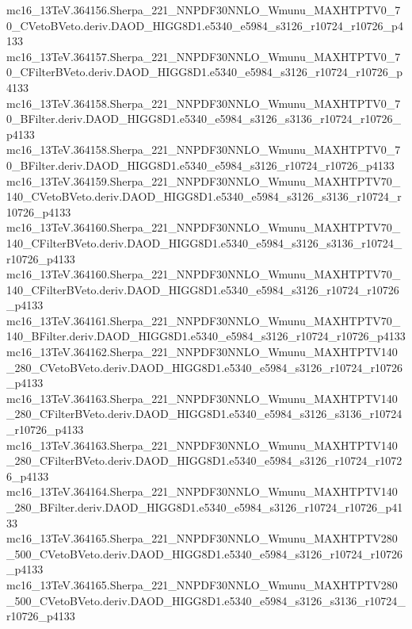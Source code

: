 \begin{scriptsize}
mc16\_13TeV.364156.Sherpa\_221\_NNPDF30NNLO\_Wmunu\_MAXHTPTV0\_70\_CVetoBVeto.deriv.DAOD\_HIGG8D1.e5340\_e5984\_s3126\_r10724\_r10726\_p4133 \\
mc16\_13TeV.364157.Sherpa\_221\_NNPDF30NNLO\_Wmunu\_MAXHTPTV0\_70\_CFilterBVeto.deriv.DAOD\_HIGG8D1.e5340\_e5984\_s3126\_r10724\_r10726\_p4133 \\
mc16\_13TeV.364158.Sherpa\_221\_NNPDF30NNLO\_Wmunu\_MAXHTPTV0\_70\_BFilter.deriv.DAOD\_HIGG8D1.e5340\_e5984\_s3126\_s3136\_r10724\_r10726\_p4133 \\
mc16\_13TeV.364158.Sherpa\_221\_NNPDF30NNLO\_Wmunu\_MAXHTPTV0\_70\_BFilter.deriv.DAOD\_HIGG8D1.e5340\_e5984\_s3126\_r10724\_r10726\_p4133 \\
mc16\_13TeV.364159.Sherpa\_221\_NNPDF30NNLO\_Wmunu\_MAXHTPTV70\_140\_CVetoBVeto.deriv.DAOD\_HIGG8D1.e5340\_e5984\_s3126\_s3136\_r10724\_r10726\_p4133 \\
mc16\_13TeV.364160.Sherpa\_221\_NNPDF30NNLO\_Wmunu\_MAXHTPTV70\_140\_CFilterBVeto.deriv.DAOD\_HIGG8D1.e5340\_e5984\_s3126\_s3136\_r10724\_r10726\_p4133 \\
mc16\_13TeV.364160.Sherpa\_221\_NNPDF30NNLO\_Wmunu\_MAXHTPTV70\_140\_CFilterBVeto.deriv.DAOD\_HIGG8D1.e5340\_e5984\_s3126\_r10724\_r10726\_p4133 \\
mc16\_13TeV.364161.Sherpa\_221\_NNPDF30NNLO\_Wmunu\_MAXHTPTV70\_140\_BFilter.deriv.DAOD\_HIGG8D1.e5340\_e5984\_s3126\_r10724\_r10726\_p4133 \\
mc16\_13TeV.364162.Sherpa\_221\_NNPDF30NNLO\_Wmunu\_MAXHTPTV140\_280\_CVetoBVeto.deriv.DAOD\_HIGG8D1.e5340\_e5984\_s3126\_r10724\_r10726\_p4133 \\
mc16\_13TeV.364163.Sherpa\_221\_NNPDF30NNLO\_Wmunu\_MAXHTPTV140\_280\_CFilterBVeto.deriv.DAOD\_HIGG8D1.e5340\_e5984\_s3126\_s3136\_r10724\_r10726\_p4133 \\
mc16\_13TeV.364163.Sherpa\_221\_NNPDF30NNLO\_Wmunu\_MAXHTPTV140\_280\_CFilterBVeto.deriv.DAOD\_HIGG8D1.e5340\_e5984\_s3126\_r10724\_r10726\_p4133 \\
mc16\_13TeV.364164.Sherpa\_221\_NNPDF30NNLO\_Wmunu\_MAXHTPTV140\_280\_BFilter.deriv.DAOD\_HIGG8D1.e5340\_e5984\_s3126\_r10724\_r10726\_p4133 \\
mc16\_13TeV.364165.Sherpa\_221\_NNPDF30NNLO\_Wmunu\_MAXHTPTV280\_500\_CVetoBVeto.deriv.DAOD\_HIGG8D1.e5340\_e5984\_s3126\_r10724\_r10726\_p4133 \\
mc16\_13TeV.364165.Sherpa\_221\_NNPDF30NNLO\_Wmunu\_MAXHTPTV280\_500\_CVetoBVeto.deriv.DAOD\_HIGG8D1.e5340\_e5984\_s3126\_s3136\_r10724\_r10726\_p4133 \\

\end{scriptsize}
